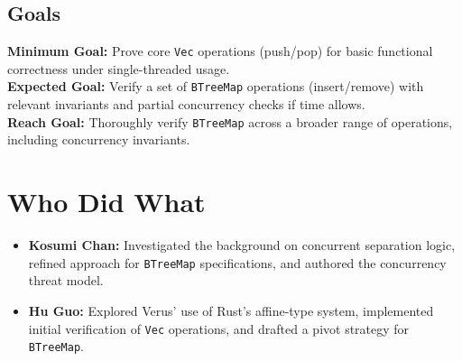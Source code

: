 \documentclass[conference]{IEEEtran}
\begin{document}
\subsection{Goals}
\noindent\textbf{Minimum Goal:} Prove core \texttt{Vec} operations (push/pop) for basic functional correctness under single-threaded usage.\\
\textbf{Expected Goal:} Verify a set of \texttt{BTreeMap} operations (insert/remove) with relevant invariants and partial concurrency checks if time allows.\\
\textbf{Reach Goal:} Thoroughly verify \texttt{BTreeMap} across a broader range of operations, including concurrency invariants.

\section{Who Did What}
\begin{itemize}
\item \textbf{Kosumi Chan:} Investigated the background on concurrent separation logic, refined approach for \texttt{BTreeMap} specifications, and authored the concurrency threat model.
\item \textbf{Hu Guo:} Explored Verus' use of Rust's affine-type system, implemented initial verification of \texttt{Vec} operations, and drafted a pivot strategy for \texttt{BTreeMap}.
\end{itemize}


\printbibliography
\end{document}

